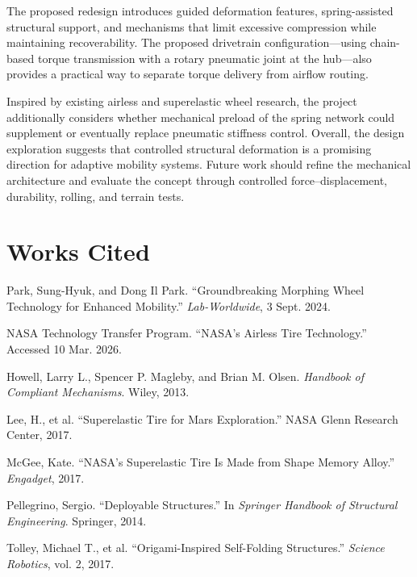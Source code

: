\documentclass[11pt]{article}
\begin{document}
The proposed redesign introduces guided deformation features, spring-assisted structural support, and mechanisms that limit excessive compression while maintaining recoverability. The proposed drivetrain configuration---using chain-based torque transmission with a rotary pneumatic joint at the hub---also provides a practical way to separate torque delivery from airflow routing.

Inspired by existing airless and superelastic wheel research, the project additionally considers whether mechanical preload of the spring network could supplement or eventually replace pneumatic stiffness control. Overall, the design exploration suggests that controlled structural deformation is a promising direction for adaptive mobility systems. Future work should refine the mechanical architecture and evaluate the concept through controlled force--displacement, durability, rolling, and terrain tests.

\clearpage
\section*{Works Cited}
\small
\begin{enumerate}[label={[\arabic*]},leftmargin=2.2em]
  \item Park, Sung-Hyuk, and Dong Il Park. ``Groundbreaking Morphing Wheel Technology for Enhanced Mobility.'' \textit{Lab-Worldwide}, 3 Sept. 2024.
  \item NASA Technology Transfer Program. ``NASA's Airless Tire Technology.'' Accessed 10 Mar. 2026.
  \item Howell, Larry L., Spencer P. Magleby, and Brian M. Olsen. \textit{Handbook of Compliant Mechanisms}. Wiley, 2013.
  \item Lee, H., et al. ``Superelastic Tire for Mars Exploration.'' NASA Glenn Research Center, 2017.
  \item McGee, Kate. ``NASA's Superelastic Tire Is Made from Shape Memory Alloy.'' \textit{Engadget}, 2017.
  \item Pellegrino, Sergio. ``Deployable Structures.'' In \textit{Springer Handbook of Structural Engineering}. Springer, 2014.
  \item Tolley, Michael T., et al. ``Origami-Inspired Self-Folding Structures.'' \textit{Science Robotics}, vol. 2, 2017.
\end{enumerate}
\end{document}
